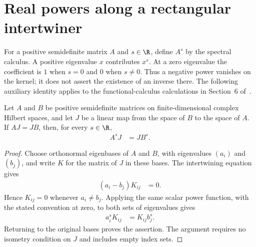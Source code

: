 \section{Real powers along a rectangular intertwiner}
\label{sec:real_power_intertwine}

For a positive semidefinite matrix $A$ and $s\in\R$, define $A^s$
by the spectral calculus. A positive eigenvalue $x$ contributes $x^s$.
At a zero eigenvalue the coefficient is $1$ when $s=0$ and $0$ when
$s\neq0$. Thus a negative power vanishes on the kernel; it does not
assert the existence of an inverse there.
The following auxiliary identity applies to the functional-calculus
calculations in Section~6
of~\cite{OpenAI2026AreaLaw}.

\begin{theorem}
  \label{thm:real_power_intertwine}
  \leanok
  Let $A$ and $B$ be positive semidefinite matrices on finite-dimensional
  complex Hilbert spaces, and let $J$ be a linear map from the space of
  $B$ to the space of $A$. If $AJ=JB$, then, for every $s\in\R$,
  \begin{align}
    A^sJ&=JB^s.
  \end{align}
\end{theorem}

\begin{proof}
  \leanok
  Choose orthonormal eigenbases of $A$ and $B$, with eigenvalues
  $(a_i)$ and $(b_j)$, and write $K$ for the matrix of $J$ in these
  bases. The intertwining equation gives
  \begin{align}
    (a_i-b_j)K_{ij}&=0.
  \end{align}
  Hence $K_{ij}=0$ whenever $a_i\neq b_j$. Applying the same scalar
  power function, with the stated convention at zero, to both sets of
  eigenvalues gives
  \begin{align}
    a_i^sK_{ij}&=K_{ij}b_j^s.
  \end{align}
  Returning to the original bases proves the assertion. The argument
  requires no isometry condition on $J$ and includes empty index sets.
\end{proof}
